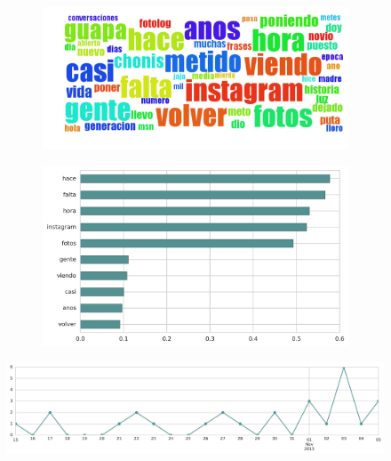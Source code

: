 \begin{figure}[htbp!]
    \centering
    \begin{subfigure}[b]{0.49\textwidth}
        \includegraphics[width=\textwidth]{twitter_murcia/report_images/topic-07-wordcloud.jpg}
    \end{subfigure}
    \begin{subfigure}[b]{0.49\textwidth}
        \includegraphics[width=\textwidth]{twitter_murcia/report_images/topic-07-terms.jpg}
    \end{subfigure}
\end{figure}

\begin{figure}[htbp!]
    \centering
    \includegraphics[width=\textwidth]{twitter_murcia/report_images/topic-07-timeseries.jpg}
\end{figure}

